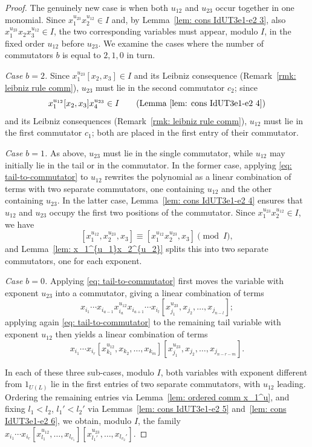 \documentclass[a4paper,reqno]{amsart}
\theoremstyle{definition}
\numberwithin{equation}{section}
\numberwithin{theorem}{section}
\begin{document}
\begin{proof}
The genuinely new case is when both $u_{12}$ and $u_{23}$ occur together in one monomial. Since
$x_1^{u_{23}}x_2^{u_{12}}\in I$ and, by Lemma~\ref{lem: cons IdUT3e1-e2 3}, also
$x_1^{u_{23}}x_2x_3^{u_{12}}\in I$, the two corresponding variables must appear, modulo $I$, in the fixed
order $u_{12}$ before $u_{23}$.  We examine the cases where the number of commutators $b$ is equal to $2,1,0$ in turn.



\smallskip
\noindent\emph{Case $b=2$.} Since $x_1^{u_{23}}[x_2,x_3]\in I$ and its Leibniz consequence
(Remark~\ref{rmk: leibniz rule comm}), $u_{23}$ must lie in the second commutator $c_2$; since
$$
x_1^{u_{12}}[x_2,x_3]x_4^{u_{23}}\in I \qquad \text{(Lemma~\ref{lem: cons IdUT3e1-e2 4})}
$$
and its Leibniz consequences (Remark~\ref{rmk: leibniz rule comm}), $u_{12}$ must lie in the first commutator $c_1$;
both are placed in the first entry of their commutator.

\smallskip


\noindent\emph{Case $b=1$.} As above, $u_{23}$ must lie in the single commutator, while $u_{12}$
may initially lie in the tail or in the commutator. In the former case, applying \eqref{eq: tail-to-commutator} to $u_{12}$ rewrites the polynomial as a linear combination of terms with two separate commutators, one containing $u_{12}$ and the other containing $u_{23}$. In the latter case, Lemma~\ref{lem: cons IdUT3e1-e2 4} ensures that $u_{12}$ and $u_{23}$ occupy the first two positions of the commutator.  Since $x_1^{u_{23}}x_2^{u_{12}}\in I$, we have
$$
[x_1^{u_{12}},x_2^{u_{23}},x_3]\equiv[x_1^{u_{12}}x_2^{u_{23}},x_3]\pmod I,
$$
and Lemma~\ref{lem: x_1^{u_1}x_2^{u_2}} splits this into two separate commutators, one for each
exponent.

\smallskip
\noindent\emph{Case $b=0$.} Applying \eqref{eq: tail-to-commutator} first moves the variable with
exponent $u_{23}$ into a commutator, giving a linear combination of terms
$$
x_{i_1}\cdots x_{i_{a-1}}x_{i_a}^{u_{12}}x_{i_{a+1}}\cdots x_{i_l}
[x_{j_1}^{u_{23}},x_{j_2},\ldots,x_{j_{n-l}}];
$$
applying again \eqref{eq: tail-to-commutator} to the remaining tail variable with exponent $u_{12}$ then
yields a linear combination of terms
$$
x_{i_1}\cdots x_{i_r}[x_{k_1}^{u_{12}},x_{k_2},\ldots,x_{k_m}]
[x_{j_1}^{u_{23}},x_{j_2},\ldots,x_{j_{n-r-m}}].
$$

\smallskip
In each of these three sub-cases, modulo $I$, both  variables with exponent different from $1_{U(L)}$ lie in the first entries of
two separate commutators, with $u_{12}$ leading. Ordering the remaining entries via
Lemma~\ref{lem: ordered comm x_1^u}, and fixing $l_1<l_2$, $l_1'<l_2'$ via
Lemmas~\ref{lem: cons IdUT3e1-e2 5} and~\ref{lem: cons IdUT3e1-e2 6}, we obtain, modulo $I$, the
family $x_{i_1}\cdots x_{i_r}[x_{l_1}^{u_{12}},\ldots,x_{l_{v_1}}][x_{l_1'}^{u_{23}},\ldots,x_{l_{v_2}'}]$.


\end{proof}
\end{document}
